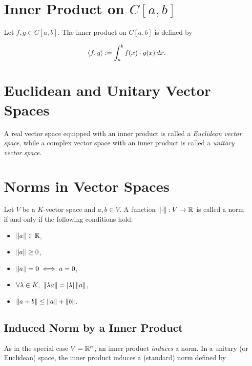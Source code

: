\section{Inner Product on \texorpdfstring{\( C[a, b] \)}{}}

Let \( f, g \in C[a, b] \). The inner product on \( C[a, b] \) is defined by

\[
    \left\langle f, g\right\rangle := \int_a^b f(x) \cdot g(x) \, dx.
\]

\section{Euclidean and Unitary Vector Spaces}

A real vector space equipped with an inner product is called a \emph{Euclidean vector space}, while a 
complex vector space with an inner product is called a \emph{unitary vector space}.

\section{Norms in Vector Spaces}

Let \( V \) be a \( K \)-vector space and \( a, b \in V \). A function \( \left\| \cdot \right\| : V \to \mathbb{R} \) 
is called a norm if and only if the following conditions hold:

\begin{itemize}

    \item \( \left\| a \right\| \in \mathbb{R} \),

    \item \( \left\| a \right\| \geq 0 \),

    \item \( \left\| a \right\| = 0 \iff a = 0 \),

    \item \( \forall \lambda \in K, \ \left\|  \lambda a  \right\| = |\lambda| \left\|  a  \right\| \),

    \item \( \left\|  a + b  \right\| \leq \left\|  a  \right\| + \left\|  b  \right\| \).

\end{itemize}

\subsection{Induced Norm by a Inner Product}

As in the special case \( V = \mathbb{R}^n \), an inner product \emph{induces} a norm.
In a unitary (or Euclidean) space, the inner product induces a (standard) norm defined by

